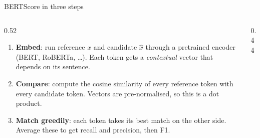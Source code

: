 \documentclass[aspectratio=169,11pt]{beamer}
\begin{document}
\begin{frame}{BERTScore in three steps}
  \begin{columns}[T]
    \begin{column}{0.52\textwidth}
      \small
      \begin{enumerate}
        \item \textbf{Embed}: run reference $x$ and candidate $\hat x$ through a pretrained encoder (BERT, RoBERTa, \ldots). Each token gets a \emph{contextual} vector that depends on its sentence.
        \item \textbf{Compare}: compute the cosine similarity of every reference token with every candidate token. Vectors are pre-normalised, so this is a dot product.
        \item \textbf{Match greedily}: each token takes its best match on the other side. Average these to get recall and precision, then F1.
      \end{enumerate}
    \end{column}
    \begin{column}{0.44\textwidth}
      \centering
    \end{column}
  \end{columns}
\end{frame}
\end{document}
